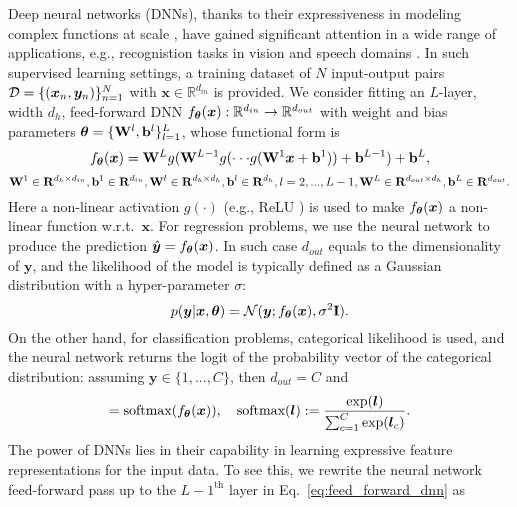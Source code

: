 %
Deep neural networks (DNNs), thanks to their expressiveness in modeling complex functions at scale \citep{lecun2015dl}, have gained significant attention in a wide range of applications, e.g., recognistion tasks in vision and speech domains \citep{dehghani2023scaling,kirillov2023segment,zhang2023google}.
%
In such supervised learning settings, a training dataset of $N$ input-output pairs $\mathcal{D}=\{(\bm{x}_n,\bm{y}_n)\}_{n=1}^N$ with $\bm{x} \in \mathbb{R}^{d_{in}}$ is provided.
%
We consider fitting an $L$-layer, width $d_h$, feed-forward DNN $f_{\bm{\theta}}(\bm{x}): \mathbb{R}^{d_{in}} \rightarrow \mathbb{R}^{d_{out}}$ with weight and bias parameters $\bm{\theta}=\{\mathbf{W}^l, \mathbf{b}^l\}_{l=1}^L$, whose functional form is
\begin{equation}
f_{\bm{\theta}}(\bm{x})=\mathbf{W}^L g(\mathbf{W}^{L-1}g(\cdot\cdot\cdot g(\mathbf{W}^1 \bm{x}+\mathbf{b}^1))+\mathbf{b}^{L-1})+\mathbf{b}^L,
\label{eq:feed_forward_dnn}
\end{equation}
%
\[\mathbf{W}^1 \in \mathbf{R}^{d_h \times d_{in}}, \mathbf{b}^1 \in \mathbf{R}^{d_{in}}, \mathbf{W}^l \in \mathbf{R}^{d_h \times d_h}, \mathbf{b}^l \in \mathbf{R}^{d_h}, l = 2, ..., L-1, \mathbf{W}^L \in \mathbf{R}^{d_{out} \times d_h}, \mathbf{b}^L \in \mathbf{R}^{d_{out}}. \]
%
Here a non-linear activation $g(\cdot)$ (e.g., ReLU \citep{hinton2010relu}) is used to make $f_{\bm{\theta}}(\bm{x})$ a non-linear function w.r.t.~$\bm{x}$.
%
For regression problems, we use the neural network to produce the prediction $\hat{\bm{y}} = f_{\bm{\theta}}(\bm{x})$. In such case $d_{out}$ equals to the dimensionality of $\bm{y}$, and the likelihood of the model is typically defined as a Gaussian distribution with a hyper-parameter $\sigma$:
\begin{equation}
    p(\bm{y} | \bm{x}, \bm{\theta}) = \mathcal{N}(\bm{y}; f_{\bm{\theta}}(\bm{x}), \sigma^2 \mathbf{I}).
\end{equation}
%
On the other hand, for classification problems, categorical likelihood is used, and the neural network returns the logit of the probability vector of the categorical distribution: assuming $\bm{y} \in \{1, ..., C \}$, then $d_{out} = C$ and
\begin{equation}
    [p(\bm{y} = 1| \bm{x}, \mparam), ..., p(\bm{y} = C| \bm{x}, \mparam)] = \text{softmax}(f_{\mparam}(\bm{x})), \quad \text{softmax}(\bm{l}) := \frac{\exp(\bm{l})}{ \sum_{c=1}^C \exp(\bm{l}_c)}.
\end{equation}
%
The power of DNNs lies in their capability in learning expressive feature representations for the input data. To see this, we rewrite the neural network feed-forward pass up to the $L-1^{\text{th}}$ layer in Eq.~\eqref{eq:feed_forward_dnn} as
